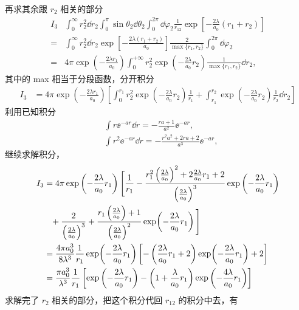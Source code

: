 再求其余跟 $r_2$ 相关的部分
\begin{align}
    I_3{}& \int_0^\infty r_2^2 \dd r_2 \int_0^\pi \sin\theta_2 \dd\theta_2 \int_0^{2\pi}\dd\varphi_2 \frac1{r_{12}}
    \exp\left[-\frac{2\lambda}{a_0}(r_1 + r_2)\right] 
    \\
    ={}& \int_0^\infty r_2^2 \dd r_2 \exp\left[
        -\frac{2\lambda(r_1 + r_2)}{a_0}
    \right] \frac{2}{\max\{r_1, r_2\}} 
    \int_0^{2\pi} \dd\varphi_2 \\
    ={}& 4\pi \exp\left(-\frac{2\lambda r_1}{a_0}\right) 
    \int_0^{+\infty} r_2^2 \exp\!\left(-\frac{2\lambda}{a_0}r_2\right) \frac1{\max\{r_1, r_2\}} \dd r_2, 
\end{align}
其中的 max 相当于分段函数，分开积分
\begin{align}
    I_3 &= 4\pi \exp\left(
        -\frac{2\lambda r_1}{a_0}\right)
        \left[
            \int_0^{r_1} r_2^2 \exp\left(- \frac{2\lambda}{a_0}r_2\right) \frac1{r_1} + \int_{r_1}^{r_2} \exp\!\left(-\frac{2\lambda}{a_0}r_2\right) \frac1{r_2} \dd r_2
        \right]
\end{align}
利用已知积分
\begin{align}
    &\int r \ee^{-ar} \dd r= - \frac{ra + 1}{a^2} \ee^{-a r}, \\
    &\int r^2 \ee^{-ar}\dd r = - \frac{r^2a^2 + 2ra + 2}{a^3} \ee^{-ar},
\end{align}
继续求解积分，
\begin{align}
    I_3 &= 4\pi \exp\left(- \frac{2\lambda}{a_0}r_1\right) 
    \Bigg[
        \frac 1{r_1} - \frac{r_1^2 \left(\frac{2\lambda}{a_0}\right)^2 + 2 \frac{2\lambda}{a_0} r_1 + 2}{\left(\frac{2\lambda}{a_0}\right)^3} \exp\left(-\frac{2\lambda}{a_0}r_1\right) \notag\\
    &\phantom{=} + \frac{2}{\left(\frac{2\lambda}{a_0}\right)^3} + \frac{r_1 \left(\frac{2\lambda}{a_0}\right) + 1}{\left(\frac{2\lambda}{a_0}\right)^2} \exp\!\left(-\frac{2\lambda}{a_0}r_1\right)\Bigg]\\
    &=\frac{4\pi a_0^3}{8\lambda^3} \frac1{r_1} \exp\!\left(-\frac{2\lambda}{a_0}r_1\right) 
    \left[
        -\left(\frac{2\lambda}{a_0}r_1 + 2\right) \exp\!\left(-\frac{2\lambda}{a_0}r_1\right) + 2
    \right] \\
    &=\frac{\pi a_0^3}{\lambda^3} \frac1{r_1} \left[
        \exp\left(-\frac{2\lambda}{a_0}r_1\right) - \left(1+\frac{\lambda}{a_0}r_1\right) \exp\left(-\frac{4\lambda}{a_0}r_1\right)
    \right]
\end{align}
求解完了 $r_2$ 相关的部分，把这个积分代回 $r_{12}$ 的积分中去，有
